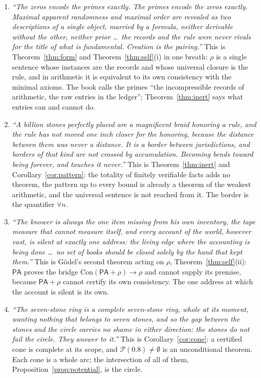 \documentclass[11pt]{article}
\theoremstyle{definition}
\theoremstyle{remark}
\newcommand{\PA}{\mathsf{PA}}
\newcommand{\Con}{\mathrm{Con}}
\begin{document}
\begin{enumerate}
\item[\textbf{Pages 33--34.}] \emph{``The zeros encode the primes exactly. The primes encode the zeros exactly. Maximal apparent randomness and maximal order are revealed as two descriptions of a single object, married by a formula, neither derivable without the other, neither prior \dots\ the records and the rule were never rivals for the title of what is fundamental. Creation is the pairing.''} This is Theorem~\ref{thm:form} and Theorem~\ref{thm:self}(i) in one breath: $\rho$ is a single sentence whose instances are the records and whose universal closure is the rule, and in arithmetic it is equivalent to its own consistency with the minimal axioms. The book calls the primes ``the incompressible records of arithmetic, the raw entries in the ledger''; Theorem~\ref{thm:inert} says what entries can and cannot do.

\item[\textbf{Page 165.}] \emph{``A billion stones perfectly placed are a magnificent braid honoring a rule, and the rule has not moved one inch closer for the honoring, because the distance between them was never a distance. It is a border between jurisdictions, and borders of that kind are not crossed by accumulation. Becoming bends toward being forever, and touches it never.''} This is Theorem~\ref{thm:inert} and Corollary~\ref{cor:pattern}: the totality of finitely verifiable facts adds no theorem, the pattern up to every bound is already a theorem of the weakest arithmetic, and the universal sentence is not reached from it. The border is the quantifier $\forall n$.

\item[\textbf{Pages 70--71.}] \emph{``The knower is always the one item missing from his own inventory, the tape measure that cannot measure itself, and every account of the world, however vast, is silent at exactly one address: the living edge where the accounting is being done \dots\ no set of books should be closed solely by the hand that kept them.''} This is G\"odel's second theorem acting on $\rho$, Theorem~\ref{thm:self}(ii): $\PA$ proves the bridge $\Con(\PA+\rho)\to\rho$ and cannot supply its premise, because $\PA+\rho$ cannot certify its own consistency. The one address at which the account is silent is its own.

\item[\textbf{Page 167.}] \emph{``The seven-stone ring is a complete seven-stone ring, whole at its moment, wanting nothing that belongs to seven stones, and so the gap between the stones and the circle carries no shame in either direction: the stones do not fail the circle. They answer to it.''} This is Corollary~\ref{cor:cone}: a certified cone is complete at its scope, and $\mathcal P(0.8)\neq\emptyset$ is an unconditional theorem. Each cone is a whole arc; the intersection of all of them, Proposition~\ref{prop:potential}, is the circle.


\end{enumerate}
\end{document}
